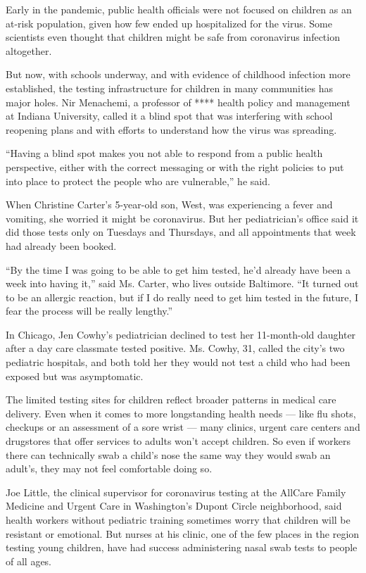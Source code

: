 Early in the pandemic, public health officials were not focused on
children as an at-risk population, given how few ended up hospitalized
for the virus. Some scientists even thought that children might be safe
from coronavirus infection altogether.

But now, with schools underway, and with evidence of childhood infection
more established, the testing infrastructure for children in many
communities has major holes. Nir Menachemi, a professor of **** health
policy and management at Indiana University, called it a blind spot that
was interfering with school reopening plans and with efforts to
understand how the virus was spreading.

``Having a blind spot makes you not able to respond from a public health
perspective, either with the correct messaging or with the right
policies to put into place to protect the people who are vulnerable,''
he said.

When Christine Carter's 5-year-old son, West, was experiencing a fever
and vomiting, she worried it might be coronavirus. But her
pediatrician's office said it did those tests only on Tuesdays and
Thursdays, and all appointments that week had already been booked.

``By the time I was going to be able to get him tested, he'd already
have been a week into having it,'' said Ms. Carter, who lives outside
Baltimore. ``It turned out to be an allergic reaction, but if I do
really need to get him tested in the future, I fear the process will be
really lengthy.''

In Chicago, Jen Cowhy's pediatrician declined to test her 11-month-old
daughter after a day care classmate tested positive. Ms. Cowhy, 31,
called the city's two pediatric hospitals, and both told her they would
not test a child who had been exposed but was asymptomatic.

The limited testing sites for children reflect broader patterns in
medical care delivery. Even when it comes to more longstanding health
needs --- like flu shots, checkups or an assessment of a sore wrist ---
many clinics, urgent care centers and drugstores that offer services to
adults won't accept children. So even if workers there can technically
swab a child's nose the same way they would swab an adult's, they may
not feel comfortable doing so.

Joe Little, the clinical supervisor for coronavirus testing at the
AllCare Family Medicine and Urgent Care in Washington's Dupont Circle
neighborhood, said health workers without pediatric training sometimes
worry that children will be resistant or emotional. But nurses at his
clinic, one of the few places in the region testing young children, have
had success administering nasal swab tests to people of all ages.

